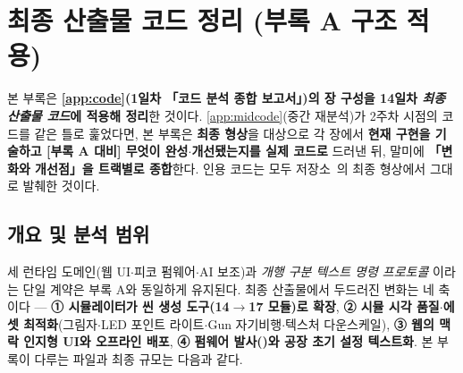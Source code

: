 \chapter{최종 산출물 코드 정리 (부록 A 구조 적용)}
\label{app:finalcode}

본 부록은 \textbf{\ref{app:code}(1일차 「코드 분석 종합 보고서」)의 장 구성을 14일차
\emph{최종 산출물 코드}에 적용해 정리}한 것이다. \ref{app:midcode}(중간 재분석)가 2주차
시점의 코드를 같은 틀로 훑었다면, 본 부록은 \textbf{최종 형상}을 대상으로 각 장에서
\textbf{현재 구현을 기술하고 \textnormal{[부록 A 대비]} 무엇이 완성$\cdot$개선됐는지를 실제
코드로} 드러낸 뒤, 말미에 \textbf{「변화와 개선점」을 트랙별로 종합}한다. 인용 코드는 모두
저장소~\cite{ares-repo}의 최종  형상에서 그대로 발췌한 것이다.

\section{개요 및 분석 범위}
세 런타임 도메인(웹 UI$\cdot$피코 펌웨어$\cdot$AI 보조)과 \emph{개행 구분 텍스트 명령 프로토콜}
이라는 단일 계약은 부록 A와 동일하게 유지된다. 최종 산출물에서 두드러진 변화는 네 축이다 ---
\textbf{① 시뮬레이터가 씬 생성 도구(14$\to$17 모듈)로 확장}, \textbf{② 시뮬 시각 품질$\cdot$에셋
최적화}(그림자$\cdot$LED 포인트 라이트$\cdot$Gun 자기비행$\cdot$텍스처 다운스케일), \textbf{③ 웹의
맥락 인지형 UI와 오프라인  배포}, \textbf{④ 펌웨어 발사()와
공장 초기 설정 텍스트화}. 본 부록이 다루는 파일과 최종 규모는 다음과 같다.

